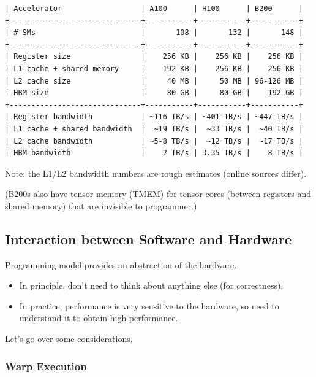 \documentclass[12pt,twoside]{article}
\begin{document}
\begin{verbatim}
| Accelerator                  | A100      | H100      | B200      |
+------------------------------+-----------+-----------+-----------+
| # SMs                        |       108 |       132 |       148 |
+------------------------------+-----------+-----------+-----------+
| Register size                |    256 KB |    256 KB |    256 KB |
| L1 cache + shared memory     |    192 KB |    256 KB |    256 KB |
| L2 cache size                |     40 MB |     50 MB | 96-126 MB |
| HBM size                     |     80 GB |     80 GB |    192 GB |
+------------------------------+-----------+-----------+-----------+
| Register bandwidth           | ~116 TB/s | ~401 TB/s | ~447 TB/s |
| L1 cache + shared bandwidth  |  ~19 TB/s |  ~33 TB/s |  ~40 TB/s |
| L2 cache bandwidth           | ~5-8 TB/s |  ~12 TB/s |  ~17 TB/s |
| HBM bandwidth                |    2 TB/s | 3.35 TB/s |    8 TB/s |
\end{verbatim}

Note: the L1/L2 bandwidth numbers are rough estimates (online sources differ).

\begin{center}
    (B200s also have tensor memory (TMEM) for tensor cores (between registers and shared memory) that are invisible to programmer.)
\end{center}

\subsection*{Interaction between Software and Hardware}

Programming model provides an abstraction of the hardware.

\begin{itemize}
    \item In principle, don't need to think about anything else (for correctness).
    \item In practice, performance is very sensitive to the hardware, so need to understand it to obtain high performance.
\end{itemize}

Let's go over some considerations.

\subsubsection*{Warp Execution}
\end{document}
